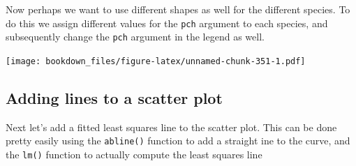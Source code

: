 \documentclass[
]{krantz}
\makeatletter
\newenvironment{Shaded}{\begin{snugshade}}{\end{snugshade}}
\newcommand{\DataTypeTok}[1]{\textcolor[rgb]{0.27,0.27,0.27}{#1}}
\newcommand{\DecValTok}[1]{\textcolor[rgb]{0.06,0.06,0.06}{#1}}
\newcommand{\FloatTok}[1]{\textcolor[rgb]{0.06,0.06,0.06}{#1}}
\newcommand{\KeywordTok}[1]{\textcolor[rgb]{0.27,0.27,0.27}{\textbf{#1}}}
\newcommand{\NormalTok}[1]{#1}
\newcommand{\OperatorTok}[1]{\textcolor[rgb]{0.43,0.43,0.43}{\textbf{#1}}}
\newcommand{\StringTok}[1]{\textcolor[rgb]{0.5,0.5,0.5}{#1}}
\newenvironment{kframe}{%
\medskip{}
\setlength{\fboxsep}{.8em}
 \def\at@end@of@kframe{}%
 \ifinner\ifhmode%
  \def\at@end@of@kframe{\end{minipage}}%
  \begin{minipage}{\columnwidth}%
 \fi\fi%
 \def\FrameCommand##1{\hskip\@totalleftmargin \hskip-\fboxsep
 \colorbox{shadecolor}{##1}\hskip-\fboxsep
     \hskip-\linewidth \hskip-\@totalleftmargin \hskip\columnwidth}%
 \MakeFramed {\advance\hsize-\width
   \@totalleftmargin\z@ \linewidth\hsize
   \@setminipage}}%
 {\par\unskip\endMakeFramed%
 \at@end@of@kframe}
\renewenvironment{Shaded}{\begin{kframe}}{\end{kframe}}
\makeatother
\begin{document}
Now perhaps we want to use different shapes as well for the different species. To do this we assign different values for the \texttt{pch} argument to each species, and subsequently change the \texttt{pch} argument in the legend as well.

\begin{Shaded}
\end{Shaded}

\texttt{[image: bookdown\_files/figure-latex/unnamed-chunk-351-1.pdf]}

\hypertarget{adding-lines-to-a-scatter-plot-1}{%
\subsection{Adding lines to a scatter plot}\label{adding-lines-to-a-scatter-plot-1}}

Next let's add a fitted least squares line to the scatter plot. This can be done pretty easily using the \texttt{abline()} function to add a straight ine to the curve, and the \texttt{lm()} function to actually compute the least squares line
\end{document}
